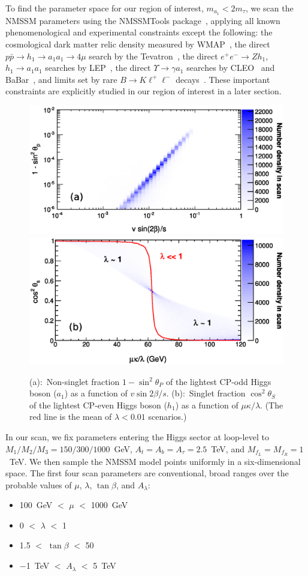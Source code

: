 \documentclass[aps,prl,twocolumn,nofootinbib,superscriptaddress]{revtex4}
\begin{document}
To find the parameter space for our region of interest, $m_{a_1} <
2m_\tau$, we scan the NMSSM parameters using the NMSSMTools
package~\cite{nmssmtools1,nmssmtools2,nmssmtools3}, applying all known
phenomenological and experimental constraints except the following:
the cosmological dark matter relic density measured by
WMAP~\cite{wmap}, the direct $p\bar{p} \to h_1 \to a_1 a_1 \to 4\mu$
search by the Tevatron~\cite{Abazov:2009yi}, the direct $e^+e^- \to Z
h_1$, $h_1 \to a_1 a_1$ searches by
LEP~\cite{lep1exclusion,lep2exclusion}, the direct $\Upsilon \to
\gamma a_1$ searches by CLEO~\cite{:2008hs} and
BaBar~\cite{Aubert:2009cp}, and limits set by rare $B \to K \ell^+
\ell^-$ decays~\cite{Freytsis:2009ct}.  These important constraints
are explicitly studied in our region of interest in a later section.

\begin{figure}[htb]
\includegraphics[width=0.49\linewidth]{pcomp12_limit}
\hfill
\includegraphics[width=0.49\linewidth]{scomp13_vs_mkoverl}

\caption{(a):~Non-singlet fraction $1-\sin^2{\theta_P}$ of the
  lightest CP-odd Higgs boson ($a_1$) as a function of $v\sin
  2\beta/s$.  (b):~Singlet fraction $\cos^2{\theta_S}$ of the lightest
  CP-even Higgs boson ($h_1$) as a function of $\mu\kappa/\lambda$.
  (The red line is the mean of $\lambda < 0.01$ scenarios.)
\label{fig:nonsingletcp1}}
\end{figure}

In our scan, we fix parameters entering the Higgs sector at loop-level
to $M_1/M_2/M_3 = 150/300/1000$~GeV, $A_t = A_b = A_\tau = 2.5$~TeV,
and $M_{f_L} = M_{f_R} =1$~TeV.  We then sample the NMSSM model points
uniformly in a six-dimensional space.  The first four scan parameters
are conventional, broad ranges over the probable values of $\mu$,
$\lambda$, $\tan\beta$, and $A_\lambda$:
\begin{itemize}
\item 100~GeV $<$ $\mu$ $<$ 1000~GeV
\item 0 $<$ $\lambda$ $<$ 1
\item 1.5 $<$ $\tan\beta$ $<$ 50
\item $-$1~TeV $<$ $A_\lambda$ $<$ 5~TeV
\end{itemize}
\end{document}
